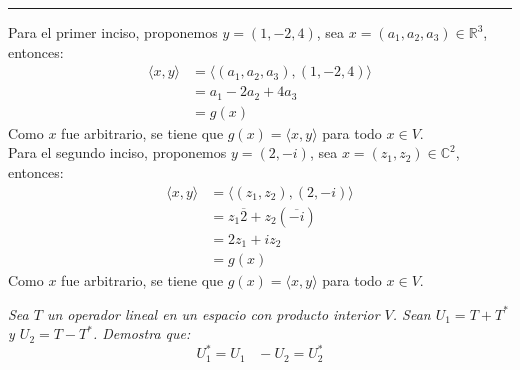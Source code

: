 \documentclass[11pt,letterpaper]{article}
\newcommand{\R}{\mathbb{R}}
\newcommand{\C}{\mathbb{C}}
\begin{document}
\rule{17cm}{0.1mm}


\begin{Solucion}
Para el primer inciso, proponemos $y=(1,-2,4)$, sea $x=(a_1,a_2,a_3)\in \R^3$, entonces:
\begin{align*}
    \langle x,y \rangle &= \langle (a_1,a_2,a_3), (1,-2,4) \rangle \\
    &= a_1 -2a_2 + 4a_3 \\
    &= g(x)
\end{align*}
Como $x$ fue arbitrario, se tiene que $g(x)=\langle x,y \rangle$ para todo $x\in V$.\\[10pt]
Para el segundo inciso, proponemos $y=(2,-i)$, sea $x=(z_1,z_2)\in \C^2$, entonces:
\begin{align*}
    \langle x,y \rangle &= \langle (z_1,z_2), (2,-i) \rangle \\
    &= z_1 \overline{2}+ z_2(\overline{-i})  \\
    &= 2z_1 + iz_2 \\
    &= g(x)
\end{align*}
Como $x$ fue arbitrario, se tiene que $g(x)=\langle x,y \rangle$ para todo $x\in V$.\\[10pt]
\end{Solucion}

\begin{tcolorbox}[
	title = \textcolor{black}{\textcolor{white}{Problema 2}},]
\textit{Sea $T$ un operador lineal en un espacio con producto interior $V$. Sean $U_1=T+T^*$ y $U_2=T-T^*$. Demostra que:
\begin{equation*}
    U_1^*=U_1\,\,\,\,\,-U_2=U_2^*
\end{equation*}
}
\end{tcolorbox}
\end{document}
